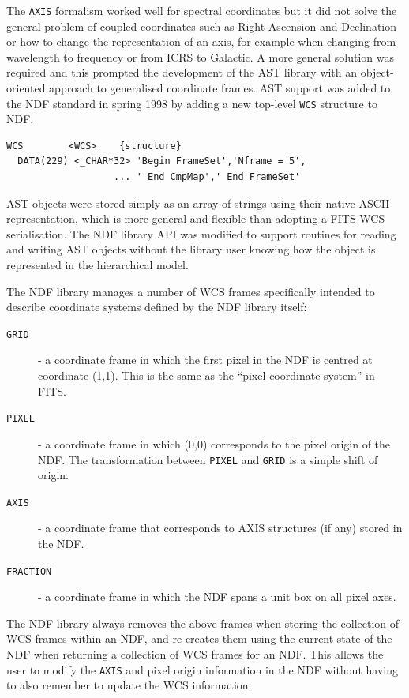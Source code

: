 \documentclass[final,authoryear,5p,times,twocolumn]{elsarticle}
\begin{document}
The \texttt{AXIS} formalism worked well for spectral coordinates but
it did not solve the general problem of coupled coordinates such as
Right Ascension and Declination or how to change the representation of
an axis, for example when changing from wavelength to frequency or from
ICRS to Galactic. A more general solution was required and this
prompted the development of the AST library
\citep{1998ASPC..145...41W} with an object-oriented approach to
generalised coordinate frames. AST support was added to the NDF
standard in spring 1998 \citep{2001ASPC..238..129B} by adding a new top-level
\texttt{WCS} structure to NDF.

{\small
\begin{verbatim}
WCS        <WCS>    {structure}
  DATA(229) <_CHAR*32> 'Begin FrameSet','Nframe = 5',
                   ... ' End CmpMap',' End FrameSet'
\end{verbatim}
}

AST objects were stored simply as an array of strings using their native
ASCII representation, which is more general and flexible
than adopting a FITS-WCS serialisation. The NDF library API was modified to support routines
for reading and writing AST objects without the library user knowing
how the object is represented in the hierarchical model.

The NDF library manages a number of WCS frames specifically intended to
describe coordinate systems defined by the NDF library itself:

\begin{description}
\item[\texttt{GRID}] - a coordinate frame in which the first pixel in the NDF is
centred at coordinate (1,1). This is the same as the ``pixel coordinate
system'' in FITS.
\item[\texttt{PIXEL}] - a coordinate frame in which (0,0) corresponds to
the pixel origin of the NDF. The transformation between \texttt{PIXEL}
and \texttt{GRID} is a simple shift of origin.
\item[\texttt{AXIS}] - a coordinate frame that corresponds to AXIS
structures (if any) stored in the NDF.
\item[\texttt{FRACTION}] - a coordinate frame in which the NDF spans a
unit box on all pixel axes.
\end{description}

The NDF library always removes the above frames when storing the
collection of WCS frames
within an NDF, and re-creates them using the current state of the NDF
when returning a collection of WCS frames for an NDF. This allows the
user to modify the \texttt{AXIS} and pixel origin information in the
NDF without having to also remember to update the WCS information.
\end{document}

